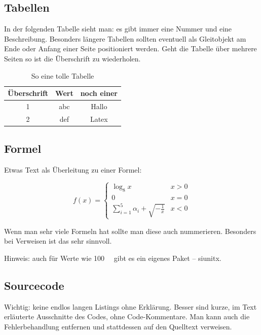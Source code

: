 \subsection{Tabellen}

In der folgenden Tabelle sieht man: es gibt immer eine Nummer und
eine Beschreibung. Besonders längere Tabellen sollten eventuell als
Gleitobjekt am Ende oder Anfang einer Seite positioniert werden. Geht
die Tabelle über mehrere Seiten so ist die Überschrift zu wiederholen.

\begin{table}[h]
\begin{centering}
\begin{tabular}{|c|c|c|}
\hline 
Überschrift & Wert & noch einer\tabularnewline
\hline 
\hline 
1 & abc & Hallo\tabularnewline
\hline 
2 & def & Latex\tabularnewline
\hline 
\end{tabular}
\par\end{centering}

\caption{So eine tolle Tabelle}
\end{table}



\subsection{Formel}

Etwas Text als Überleitung zu einer Formel:

\[
f(x)=\left\{ \begin{array}{cc}
\log_{8}x & x>0\\
0 & x=0\\
\sum_{i=1}^{5}\alpha_{i}+\sqrt{-\frac{1}{x}} & x<0
\end{array}\right.
\]


Wenn man sehr viele Formeln hat sollte man diese auch nummerieren.
Besonders bei Verweisen ist das sehr sinnvoll.

Hinweis: auch für Werte wie \SI{100}{\mebi\byte} gibt es ein eigenes Paket -- siunitx.


\subsection{Sourcecode}


Wichtig: keine endlos langen Listings ohne Erklärung. Besser sind kurze, im Text erläuterte Ausschnitte 
des Codes, ohne Code-Kommentare. Man kann \zB auch die Fehlerbehandlung entfernen und stattdessen auf
den Quelltext verweisen.


